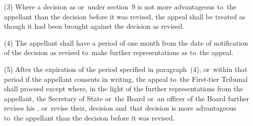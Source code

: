 \documentclass[12pt,a4paper]{article}
\begin{document}
(3) Where a decision as 
%
%
or~under section~9 is not more advantageous to~the appellant than the decision before it was 
%
revised, the appeal shall be treated as though it had been brought against the decision as 
%
revised.

(4) The appellant shall have a period of one month from the date of notification of the decision as 
%
revised to~make further representations as to~the appeal.

(5) After the expiration of the period specified in paragraph~(4), or~within that period if the appellant consents in writing, the appeal to~the 
First-tier Tribunal  %
shall proceed except where, in the light of the further representations from the appellant, the Secretary of State%
or~the Board or~an officer of the Board  %
further revises his%
, or~revise their,  %
decision and~that decision is more advantageous to~the appellant than the decision before it was 
%
revised.
\end{document}
